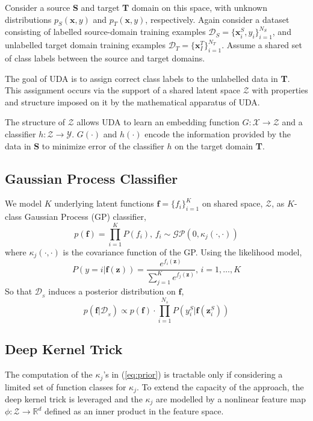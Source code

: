 \documentclass[10pt,twocolumn,letterpaper]{article}
\newcommand{\vect}[1]{\boldsymbol{\mathbf{#1}}}
\begin{document}
Consider a source \textbf{S} and target \textbf{T} domain on this space,  with unknown distributions \(p_S(\vect{x}, y)\) and \(p_T(\vect{x},y)\), respectively.  Again consider a dataset consisting of 
labelled source-domain training examples \(\mathcal{D}_S = \{\vect{x}_i^S, y_i\}_{i=1}^{N_S}\), and unlabelled target domain training examples \(\mathcal{D}_T = \{\vect{x}_I^T\}_{i=1}^{N_T}\).  Assume a shared set of class labels between the source and target domains. 

The goal of UDA is to assign correct class labels to the unlabelled data in \textbf{T}.  This assignment occurs via the support of a shared latent space \(\mathcal{Z}\) with properties and structure imposed on it by the  mathematical apparatus of UDA.  

The structure of \(\mathcal{Z}\) allows UDA to learn an embedding function \(G: \mathcal{X} \to \mathcal{Z}\) and a classifier \(h: \mathcal{Z} \to \mathcal{Y}\).   \(G(\cdot)\) and \(h(\cdot)\) encode the information provided by the data in \textbf{S} to minimize error of the classifier \(h\) on the target domain \textbf{T}.

\subsection{Gaussian Process Classifier}
We model \(K\) underlying latent functions \(\vect{f} = \{f_i\}_{i=1}^{K}\) on shared space, \(\mathcal{Z}\), as \(K\)-class Gaussian Process (GP) classifier, 
    \begin{equation} \label{eq:prior}
        p(\vect{f}) = \prod_{i=1}^{K}P(f_i), \, f_i \sim \mathcal{GP}\left(0, \kappa_j(\cdot,\cdot)\right)
    \end{equation}
where \(\kappa_j(\cdot,\cdot)\) is the covariance function of the GP. Using the likelihood model,
    \begin{equation} \label{eq:likfunc}
        P(y=i | \vect{f}(\vect{z})) = \frac{e^{f_i(\vect{z})}}{\sum_{j=1}^{K}e^{f_j(\vect{z})}}, \, i = 1,\dots,K
    \end{equation}
So that \(\mathcal{D}_{_{S}}\) induces a posterior distribution on \(\vect{f}\),
    \begin{equation} \label{eq:targetpost}
        p(\vect{f}|\mathcal{D}_{_{S}}) \propto p(\vect{f}) \cdot \prod_{i=1}^{N_s} P(y_i^{S} | \vect{f}(\vect{z}_i^{S}))
    \end{equation}

\subsection{Deep Kernel Trick}
The computation of the \(\kappa_j\)'s in (\ref{eq:prior}) is tractable only if considering a limited set of function classes for \(\kappa_j\). 
To extend the capacity of the approach, the deep kernel trick is leveraged and the \(\kappa_j\) are modelled by a nonlinear feature map \(\phi: \mathcal{Z} \to \mathbb{R}^d\) defined as an inner product in the feature space.
\end{document}
